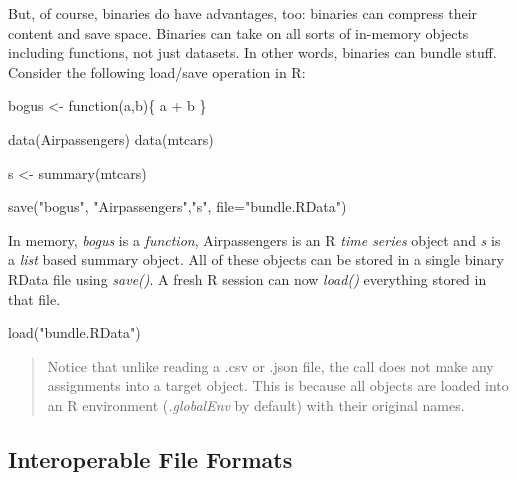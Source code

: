 \documentclass[
  12pt,
  letterpaper,
]{krantz}
\newenvironment{Shaded}{\begin{snugshade}}{\end{snugshade}}
\newcommand{\AttributeTok}[1]{\textcolor[rgb]{0.40,0.45,0.13}{#1}}
\newcommand{\ControlFlowTok}[1]{\textcolor[rgb]{0.00,0.23,0.31}{#1}}
\newcommand{\FunctionTok}[1]{\textcolor[rgb]{0.28,0.35,0.67}{#1}}
\newcommand{\NormalTok}[1]{\textcolor[rgb]{0.00,0.23,0.31}{#1}}
\newcommand{\OtherTok}[1]{\textcolor[rgb]{0.00,0.23,0.31}{#1}}
\newcommand{\SpecialCharTok}[1]{\textcolor[rgb]{0.37,0.37,0.37}{#1}}
\newcommand{\StringTok}[1]{\textcolor[rgb]{0.13,0.47,0.30}{#1}}
\begin{document}
But, of course, binaries do have advantages, too: binaries can compress
their content and save space. Binaries can take on all sorts of
in-memory objects including functions, not just datasets. In other
words, binaries can bundle stuff. Consider the following load/save
operation in R:

\normalsize

\begin{Shaded}
\begin{Highlighting}[]
\NormalTok{bogus }\OtherTok{\textless{}{-}} \ControlFlowTok{function}\NormalTok{(a,b)\{}
\NormalTok{  a }\SpecialCharTok{+}\NormalTok{ b}
\NormalTok{\} }

\FunctionTok{data}\NormalTok{(Airpassengers)}
\FunctionTok{data}\NormalTok{(mtcars)}

\NormalTok{s }\OtherTok{\textless{}{-}} \FunctionTok{summary}\NormalTok{(mtcars)}

\FunctionTok{save}\NormalTok{(}\StringTok{"bogus"}\NormalTok{, }\StringTok{"Airpassengers"}\NormalTok{,}\StringTok{"s"}\NormalTok{,}
     \AttributeTok{file=}\StringTok{"bundle.RData"}\NormalTok{)}
\end{Highlighting}
\end{Shaded}

\normalsize

In memory, \emph{bogus} is a \emph{function}, Airpassengers is an R
\emph{time series} object and \emph{s} is a
\emph{list} based summary object. All of these objects can be stored in
a single binary RData file using \emph{save()}. A fresh R session can
now \emph{load()} everything stored in that file.

\normalsize

\begin{Shaded}
\begin{Highlighting}[]
\FunctionTok{load}\NormalTok{(}\StringTok{"bundle.RData"}\NormalTok{)}
\end{Highlighting}
\end{Shaded}

\normalsize

\begin{quote}
Notice that unlike reading a .csv or .json file, the call does not make
any assignments into a target object. This is because all objects are
loaded into an R environment (\emph{.globalEnv} by default) with their
original names.
\end{quote}

\hypertarget{interoperable-file-formats}{%
\subsection{Interoperable File
Formats}\label{interoperable-file-formats}}
\end{document}
